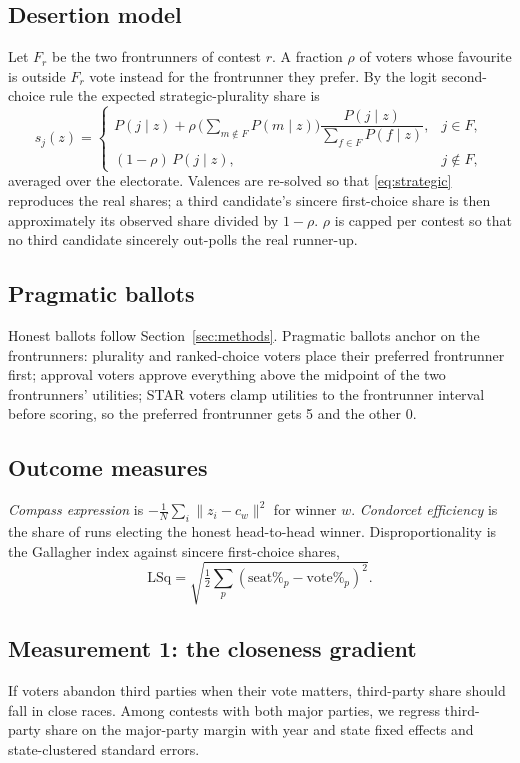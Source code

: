 \documentclass[11pt]{article}
\begin{document}
\FloatBarrier
\subsection{Desertion model}
Let $F_r$ be the two frontrunners of contest $r$. A fraction $\rho$ of voters whose favourite is outside $F_r$ vote instead for the frontrunner they prefer. By the logit second-choice rule the expected strategic-plurality share is
\begin{equation}
s_j(z) =
\begin{cases}
P(j\mid z) + \rho\,\Big(\sum_{m\notin F}P(m\mid z)\Big)\dfrac{P(j\mid z)}{\sum_{f\in F}P(f\mid z)}, & j\in F,\\[8pt]
(1-\rho)\,P(j\mid z), & j\notin F,
\end{cases}
\label{eq:strategic}
\end{equation}
averaged over the electorate. Valences are re-solved so that \eqref{eq:strategic} reproduces the real shares; a third candidate's sincere first-choice share is then approximately its observed share divided by $1-\rho$. $\rho$ is capped per contest so that no third candidate sincerely out-polls the real runner-up.

\FloatBarrier
\subsection{Pragmatic ballots}
Honest ballots follow Section~\ref{sec:methods}. Pragmatic ballots anchor on the frontrunners: plurality and ranked-choice voters place their preferred frontrunner first; approval voters approve everything above the midpoint of the two frontrunners' utilities; STAR voters clamp utilities to the frontrunner interval before scoring, so the preferred frontrunner gets 5 and the other 0.

\FloatBarrier
\subsection{Outcome measures}
\emph{Compass expression} is $-\frac1N\sum_i\lVert z_i-c_w\rVert^2$ for winner $w$. \emph{Condorcet efficiency} is the share of runs electing the honest head-to-head winner. Disproportionality is the Gallagher index against sincere first-choice shares,
\begin{equation}
\mathrm{LSq}=\sqrt{\tfrac12\sum_p\left(\text{seat}\%_p-\text{vote}\%_p\right)^2}.
\end{equation}

\FloatBarrier
\subsection{Measurement 1: the closeness gradient}
If voters abandon third parties when their vote matters, third-party share should fall in close races. Among contests with both major parties, we regress third-party share on the major-party margin with year and state fixed effects and state-clustered standard errors.
\end{document}
